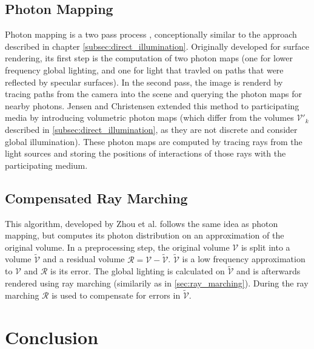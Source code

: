 \subsection{Photon Mapping}
Photon mapping is a two pass process \cite{10.1145/280814.280925}, conceptionally similar to the approach described in chapter \ref{subsec:direct_illumination}. Originally developed for surface rendering\cite{10.5555/275458.275461}, its first step is the computation of two photon maps\cite{10.1145/280814.280925} (one for lower frequency global lighting, and one for light that travled on paths that were reflected by specular surfaces). In the second pass, the image is renderd by tracing paths from the camera into the scene and querying the photon maps for nearby photons.
Jensen and Christensen \cite{10.1145/280814.280925} extended this method to participating media by introducing volumetric photon maps (which differ from the volumes $\mathcal{V}'_k$ described in \ref{subsec:direct_illumination}, as they are not discrete and consider global illumination). These photon maps are computed by tracing rays from the light sources and storing the positions of interactions of those rays with the participating medium.
\subsection{Compensated Ray Marching}
This algorithm, developed by Zhou et al. \cite{zhou2007real-time} follows the same idea as photon mapping, but computes its photon distribution on an approximation of the original volume.
In a preprocessing step, the original volume $\mathcal{V}$ is split into a volume $\widetilde{\mathcal{V}}$ and a residual volume $\mathcal{R} = \mathcal{V} - \widetilde{\mathcal{V}}$. $\widetilde{\mathcal{V}}$ is a low frequency approximation to $\mathcal{V}$ and $\mathcal{R}$ is its error. The global lighting is calculated on $\widetilde{\mathcal{V}}$ and is afterwards rendered using ray marching (similarily as in \ref{sec:ray_marching}). During the ray marching $\mathcal{R}$ is used to compensate for errors in $\widetilde{\mathcal{V}}$.
\section{Conclusion}










